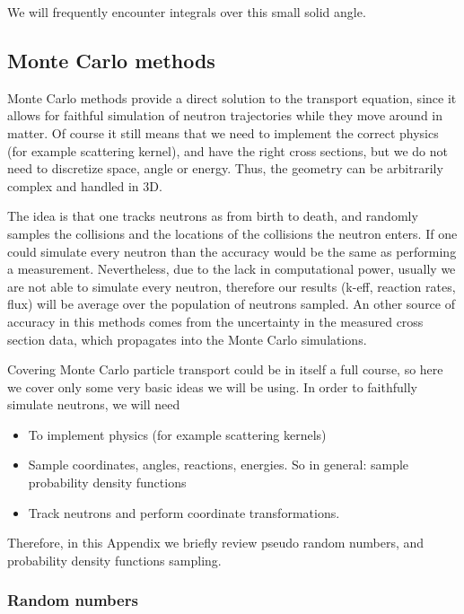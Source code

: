 We will frequently encounter integrals over this small solid angle.


\subsection{Monte Carlo methods}

Monte Carlo methods provide a direct solution to the transport equation, since it allows for faithful simulation of neutron trajectories while they move around in matter. Of course it still means that we need to implement the correct physics (for example scattering kernel), and have the right cross sections, but we do not need to discretize space, angle or energy. Thus, the geometry can be arbitrarily complex and handled in 3D.

The idea is that one tracks neutrons as from birth to death, and randomly samples the collisions and the locations of the collisions the neutron enters. If one could simulate every neutron than the accuracy would be the same as performing a measurement. Nevertheless, due to the lack in computational power, usually we are not able to simulate every neutron, therefore our results (k-eff,  reaction rates, flux) will be average over the population of neutrons sampled. An other source of accuracy in this methods comes from the uncertainty in the measured cross section data, which propagates into the Monte Carlo simulations.

Covering Monte Carlo particle transport could be in itself a full course, so here we cover only some very basic ideas we will be using. In order to faithfully simulate neutrons, we will need

\begin{itemize}
\item To implement physics (for example scattering kernels)
\item Sample coordinates, angles, reactions, energies. So in general: sample probability density functions
\item Track neutrons and perform coordinate transformations.
\end{itemize}


Therefore, in this Appendix we briefly review pseudo random numbers, and  probability density functions sampling.

\subsubsection{Random numbers}

